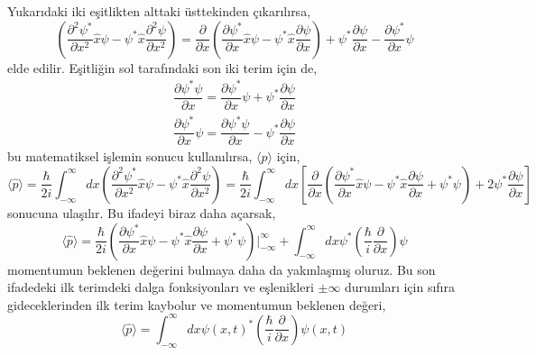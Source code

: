 \documentclass[a4paper,12pt, twoside]{article}
\begin{document}
Yukarıdaki iki eşitlikten alttaki üsttekinden çıkarılırsa,
\begin{equation*}
\left( \dfrac {\partial ^{2}\psi ^{\ast }}{\partial x^{2}}\hat x\psi -\psi ^{\ast }\hat x\dfrac {\partial ^{2}\psi }{\partial x^{2}}\right) = \dfrac {\partial }{\partial x}\left( \dfrac {\partial \psi ^{\ast }}{\partial x}\hat x\psi -\psi ^{\ast } \hat x\dfrac {\partial \psi }{\partial x}\right) +\psi ^{\ast }\dfrac {\partial \psi }{\partial x}-\dfrac {\partial \psi ^{\ast }}{\partial x}\psi 
\end{equation*}
elde edilir. Eşitliğin sol tarafındaki son iki terim için de,
\begin{align*}
\dfrac {\partial \psi ^{\ast }\psi }{\partial x}=\dfrac {\partial \psi ^{\ast }}{\partial x}\psi +\psi ^{\ast }\dfrac {\partial \psi }{\partial x}\\
\dfrac {\partial \psi ^{\ast }}{\partial x}\psi =\dfrac {\partial \psi ^{\ast }\psi }{\partial x}-\psi ^{\ast }\dfrac {\partial \psi }{\partial x}
\end{align*}
bu matematiksel işlemin sonucu kullanılırsa, $\langle p \rangle$ için,
\begin{equation*}
\langle \hat p\rangle =\dfrac {\hbar }{2i}\int ^{\infty }_{-\infty }dx\left( \dfrac {\partial ^{2}\psi ^{\ast }}{\partial x^{2}} \hat x\psi -\psi ^{\ast } \hat x\dfrac {\partial ^{2}\psi }{\partial x^{2}}\right) =  \dfrac {\hbar }{2i}\int ^{\infty }_{-\infty }dx \left[\dfrac {\partial }{\partial x}\left( \dfrac {\partial \psi ^{\ast }}{\partial x} \hat x\psi -\psi ^{\ast } \hat x\dfrac {\partial \psi }{\partial x} + \psi^\ast \psi\right) +2\psi ^{\ast }\dfrac {\partial \psi }{\partial x}\right]
\end{equation*}
sonucuna ulaşılır. Bu ifadeyi biraz daha açarsak,
\begin{equation*}
\langle \hat p\rangle = \dfrac {\hbar }{2i}\left( \dfrac {\partial \psi ^{\ast }}{\partial x}\hat x\psi -\psi ^{\ast } \hat x\dfrac {\partial \psi }{\partial x} + \psi^\ast \psi \right){\bigg |}_{-\infty}^{\infty} + \int ^{\infty }_{-\infty }dx \psi ^{\ast }\left(\dfrac {\hbar }{i}\dfrac {\partial}{\partial x}\right) \psi
\end{equation*}
momentumun beklenen değerini bulmaya daha da yakınlaşmış oluruz. Bu son ifadedeki ilk terimdeki dalga fonksiyonları ve eşlenikleri $\pm\infty$ durumları için sıfıra gideceklerinden ilk terim kaybolur ve momentumun beklenen değeri,
\begin{equation}
\langle \hat p\rangle =  \int ^{\infty }_{-\infty }dx \psi(x,t) ^{\ast }\left(\dfrac {\hbar }{i}\dfrac {\partial}{\partial x}\right) \psi(x,t)
\label{eq:expactation_value_and_op_momentum}
\end{equation}
\end{document}
